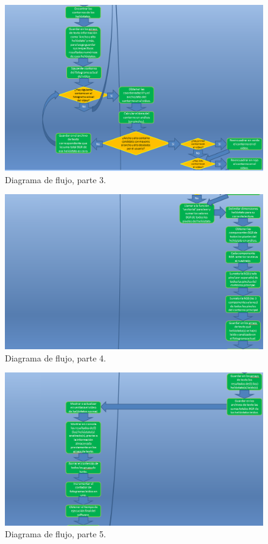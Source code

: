 \begin{figure}[h!]
  	\centering
	\includegraphics[width=\textwidth]{DiagramaFlujoSoftwareTFG/diagramaFlujo3.PNG}
	\caption{Diagrama de flujo, parte 3.
	\label{fig:DiagramaFlujoSoftwareTFG/diagramaFlujo3.PNG}}
\end{figure}

\begin{figure}[h!]
  	\centering
	\includegraphics[width=\textwidth]{DiagramaFlujoSoftwareTFG/diagramaFlujo4.PNG}
	\caption{Diagrama de flujo, parte 4.
	\label{fig:DiagramaFlujoSoftwareTFG/diagramaFlujo4.PNG}}
\end{figure}

\begin{figure}[h!]
  	\centering
	\includegraphics[width=\textwidth]{DiagramaFlujoSoftwareTFG/diagramaFlujo5.PNG}
	\caption{Diagrama de flujo, parte 5.
	\label{fig:DiagramaFlujoSoftwareTFG/diagramaFlujo5.PNG}}
\end{figure}

